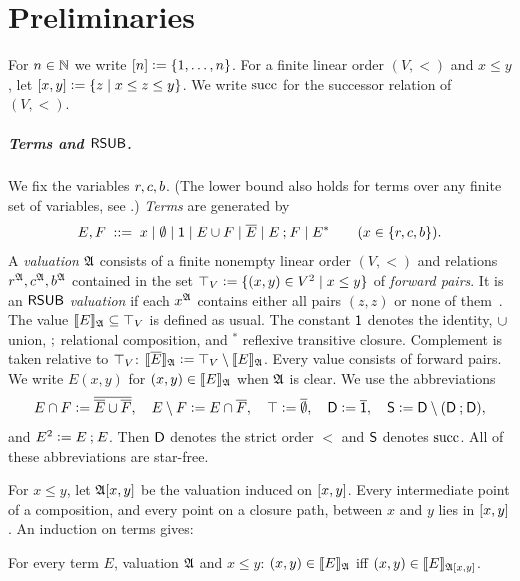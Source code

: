 \section{Preliminaries}\label{section: preliminaries}

For $n \in \mathbb{N}$ we write $[n] \mathrel{\vcentcolon=} \{1, \dots, n\}$.
For a finite linear order $(V, <)$ and $x \le y$, let $[x, y] \mathrel{\vcentcolon=} \{z \mid x \le z \le y\}$.
We write $\mathrm{succ}$ for the successor relation of $(V, <)$.

\subparagraph*{Terms and $\mathsf{RSUB}$.}
We fix the variables $r, c, b$.
(The lower bound also holds for terms over any finite set of variables, see .)
\emph{Terms} are generated by
\[
  E, F \;::=\; x \mid \emptyset \mid \mathsf{1} \mid E \cup F \mid \overline{E} \mid E \mathbin{;} F \mid E^{*}
  \qquad (x \in \{r, c, b\}).
\]
A \emph{valuation} $\mathfrak{A}$ consists of a finite nonempty linear order $(V, <)$ and relations $r^{\mathfrak{A}}, c^{\mathfrak{A}}, b^{\mathfrak{A}}$ contained in the set $\top_V \mathrel{\vcentcolon=} \{(x, y) \in V^2 \mid x \le y\}$ of \emph{forward pairs}.
It is an \emph{$\mathsf{RSUB}$ valuation} if each $x^{\mathfrak{A}}$ contains either all pairs $(z, z)$ or none of them~\cite{nakamuraFiniteRelationalSemantics2025}.
The value $\llbracket E\rrbracket_{\mathfrak{A}} \subseteq \top_V$ is defined as usual.
The constant $\mathsf{1}$ denotes the identity, $\cup$ union, $\mathbin{;}$ relational composition, and ${}^{*}$ reflexive transitive closure.
Complement is taken relative to $\top_V$: $\llbracket \overline{E}\rrbracket_{\mathfrak{A}} \mathrel{\vcentcolon=} \top_V \setminus \llbracket E\rrbracket_{\mathfrak{A}}$.
Every value consists of forward pairs.
We write $E(x, y)$ for $(x, y) \in \llbracket E\rrbracket_{\mathfrak{A}}$ when $\mathfrak{A}$ is clear.
We use the abbreviations
\[
  E \cap F \mathrel{\vcentcolon=} \overline{\overline{E} \cup \overline{F}},\quad
  E \setminus F \mathrel{\vcentcolon=} E \cap \overline{F},\quad
  \top \mathrel{\vcentcolon=} \overline{\emptyset},\quad
  \mathsf{D} \mathrel{\vcentcolon=} \overline{\mathsf{1}},\quad
  \mathsf{S} \mathrel{\vcentcolon=} \mathsf{D} \setminus (\mathsf{D} \mathbin{;} \mathsf{D}),
\]
and $E^{2} \mathrel{\vcentcolon=} E \mathbin{;} E$.
Then $\mathsf{D}$ denotes the strict order $<$ and $\mathsf{S}$ denotes $\mathrm{succ}$.
All of these abbreviations are star-free.

For $x \le y$, let $\mathfrak{A}[x, y]$ be the valuation induced on $[x, y]$.
Every intermediate point of a composition, and every point on a closure path, between $x$ and $y$ lies in $[x, y]$.
An induction on terms gives:

\begin{lemma}\label{lemma: locality}
  For every term $E$, valuation $\mathfrak{A}$ and $x \le y$: $(x, y) \in \llbracket E\rrbracket_{\mathfrak{A}}$ iff $(x, y) \in \llbracket E\rrbracket_{\mathfrak{A}[x, y]}$.
\end{lemma}

